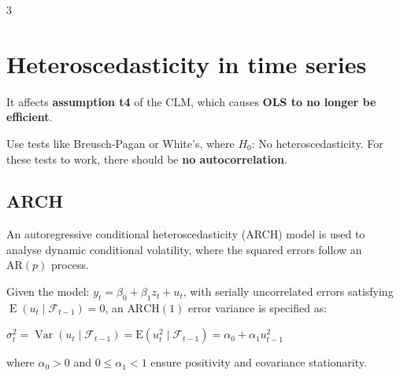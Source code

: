 \documentclass[10pt, a4paper, landscape]{article}
\DeclareMathOperator{\E}{E}
\DeclareMathOperator{\Var}{Var}
\begin{document}
\begin{multicols}{3}
\section*{Heteroscedasticity in time series}

It affects \textbf{assumption t4} of the CLM, which causes \textbf{OLS to no longer be efficient}.

Use tests like Breusch-Pagan or White's, where \( H_{0} \): No heteroscedasticity. For these tests to work, there should be \textbf{no autocorrelation}.

\subsection*{ARCH}

An autoregressive conditional heteroscedasticity (ARCH) model is used to analyse dynamic conditional volatility, where the squared errors follow an \( \text{AR}(p) \) process.

Given the model: \( y_{t} = \beta_{0} + \beta_{1} z_{t} + u_{t} \), with serially uncorrelated errors satisfying \( \E(u_{t} \mid \mathcal{F}_{t - 1}) = 0 \), an \( \text{ARCH}(1) \) error variance is specified as:

\begin{center}
	\( \sigma_{t}^{2} = \Var(u_{t} \mid \mathcal{F}_{t - 1}) = \text{E}(u_{t}^{2} \mid \mathcal{F}_{t - 1}) = \alpha_{0} + \alpha_{1} u_{t - 1}^{2} \)
\end{center}

where \( \alpha_{0} > 0 \) and \( 0 \leq \alpha_{1} < 1 \) ensure positivity and covariance stationarity.

\end{multicols}
\end{document}
